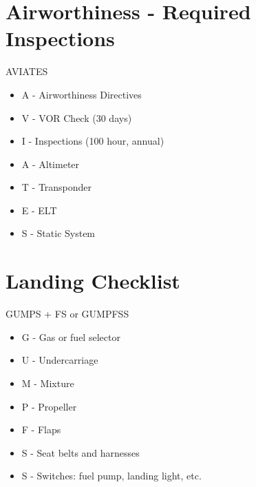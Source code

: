 \section{Airworthiness - Required Inspections}

AVIATES

\begin{itemize}
\item A - Airworthiness Directives
\item V - VOR Check (30 days)
\item I - Inspections (100 hour, annual)
\item A - Altimeter
\item T - Transponder
\item E - ELT
\item S - Static System
\end{itemize}

\section{Landing Checklist}

GUMPS + FS or GUMPFSS

\begin{itemize}
\item G - Gas or fuel selector
\item U - Undercarriage
\item M - Mixture
\item P - Propeller
\item F - Flaps
\item S - Seat belts and harnesses
\item S - Switches: fuel pump, landing light, etc.
\end{itemize}



